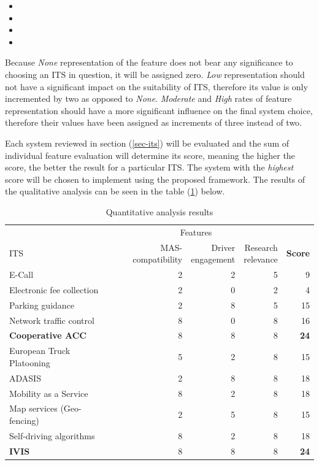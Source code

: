 \documentclass[main.tex]{subfiles}
\begin{document}
\begin{itemize}
    \item {}
    \item {}
    \item {}
    \item {}
\end{itemize}

Because \emph{None} representation of the feature does not bear any significance to choosing an ITS 
in question, it will be assigned zero. \emph{Low} representation should not have a significant impact on 
the suitability of ITS, therefore its value is only incremented by two as opposed to \emph{None}. \emph{Moderate}
and \emph{High} rates of feature representation should have a more significant influence on the final system 
choice, therefore their values have been assigned as increments of three instead of two. 

Each system reviewed in section (\ref{sec-its}) will be evaluated and the sum of individual feature evaluation 
will determine its score, meaning the higher the score, the better the result for a particular ITS. The system 
with the \emph{highest} score will be chosen to implement using the proposed framework. The results of the 
qualitative analysis can be seen in the table (\ref{qa-table}) below.

\begin{table}[htbp]
    \caption{Quantitative analysis results}
    \renewcommand{\arraystretch}{1.4}
    \centering\begin{tabular}{l*{3}{r}r} \toprule
         & \multicolumn{3}{c}{Features} & \\ \cmidrule(rl){2-4}
        ITS & \multicolumn{1}{p{6em}}{MAS-compatibility} & \multicolumn{1}{p{6em}}{Driver \newline engagement} & \multicolumn{1}{p{6em}}{Research \newline relevance} & \textbf{Score } \\ \midrule
        E-Call & 2 & 2 & 5 & 9 \\ 
        Electronic fee collection & 2 & 0 & 2 & 4 \\
        Parking guidance & 2 & 8 & 5 & 15 \\
        Network traffic control & 8 & 0 & 8 & 16 \\
        \textbf{Cooperative ACC} & 8 & 8 & 8 & \textbf{24} \\
        European Truck Platooning & 5 & 2 & 8 & 15 \\
        ADASIS & 2 & 8 & 8 & 18 \\
        Mobility as a Service & 8 & 2 & 8 & 18 \\
        Map services (Geo-fencing) & 2 & 5 & 8 & 15 \\
        \multicolumn{1}{p{5em}}{Self-driving algorithms} \& Platooning & 8 & 2 & 8 & 18 \\
        \textbf{IVIS} & 8 & 8 & 8 & \textbf{24} \\ \bottomrule
    \end{tabular}
    \label{qa-table}
\end{table}
\end{document}
